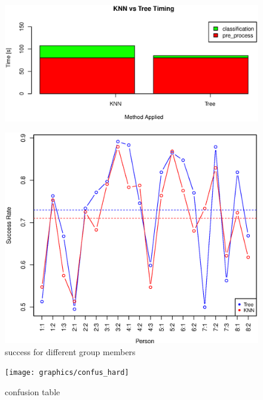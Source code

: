 \begin{figure}[H]
\centering
\includegraphics[width=\textwidth]{graphics/algo_compare_timing}
\end{figure}

\begin{figure}[H]
\centering
\includegraphics[width=\textwidth]{graphics/success_comp_hard}
\caption{success for different group members}
\end{figure}

\begin{figure}[H]
\centering
\texttt{[image: graphics/confus\_hard]}
\caption{confusion table}
\end{figure}


